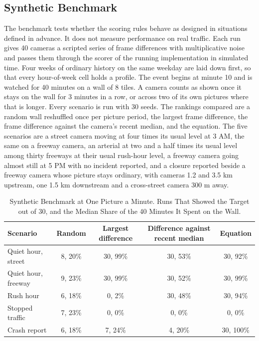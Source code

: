 \documentclass[10pt,journal,compsoc]{IEEEtran}
\begin{document}
\subsection{Synthetic Benchmark}
\label{sec:bench}
The benchmark tests whether the scoring rules behave as designed in situations defined in advance. It does not measure performance on real traffic. Each run gives 40 cameras a scripted series of frame differences with multiplicative noise and passes them through the scorer of the running implementation in simulated time. Four weeks of ordinary history on the same weekday are laid down first, so that every hour-of-week cell holds a profile. The event begins at minute 10 and is watched for 40 minutes on a wall of 8 tiles. A camera counts as shown once it stays on the wall for 3 minutes in a row, or across two of its own pictures where that is longer. Every scenario is run with 30 seeds. The rankings compared are a random wall reshuffled once per picture period, the largest frame difference, the frame difference against the camera's recent median, and the equation. The five scenarios are a street camera moving at four times its usual level at 3 AM, the same on a freeway camera, an arterial at two and a half times its usual level among thirty freeways at their usual rush-hour level, a freeway camera going almost still at 5 PM with no incident reported, and a closure reported beside a freeway camera whose picture stays ordinary, with cameras 1.2 and 3.5 km upstream, one 1.5 km downstream and a cross-street camera 300 m away.

\begin{table}[!t]
\renewcommand{\arraystretch}{1.2}
\caption{Synthetic Benchmark at One Picture a Minute. Runs That Showed the Target out of 30, and the Median Share of the 40 Minutes It Spent on the Wall.}
\label{tab:bench}
\centering
\begin{tabular}{lcccc}
\toprule
\textbf{Scenario} & \textbf{Random} & \textbf{Largest difference} & \textbf{Difference against recent median} & \textbf{Equation} \\
\midrule
Quiet hour, street & 8, 20\% & 30, 99\% & 30, 53\% & 30, 92\% \\
Quiet hour, freeway & 9, 23\% & 30, 99\% & 30, 52\% & 30, 99\% \\
Rush hour & 6, 18\% & 0, 2\% & 30, 48\% & 30, 94\% \\
Stopped traffic & 7, 23\% & 0, 0\% & 0, 0\% & 0, 0\% \\
Crash report & 6, 18\% & 7, 24\% & 4, 20\% & 30, 100\% \\
\bottomrule
\end{tabular}
\end{table}
\end{document}
